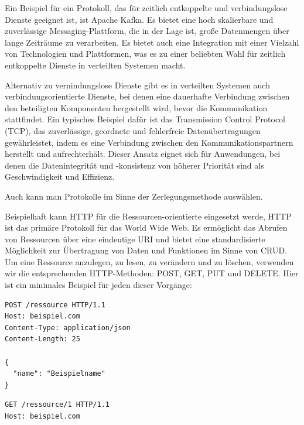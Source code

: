 Ein Beispiel für ein Protokoll, das für zeitlich entkoppelte und verbindungslose Dienste geeignet ist, ist Apache Kafka. Es bietet eine hoch skalierbare und zuverlässige Messaging-Plattform, die in der Lage ist, große Datenmengen über lange Zeiträume zu verarbeiten. Es bietet auch eine Integration mit einer Vielzahl von Technologien und Plattformen, was es zu einer beliebten Wahl für zeitlich entkoppelte Dienste in verteilten Systemen macht.

Alternativ zu vernindungslose Dienste gibt es in verteilten Systemen auch verbindungsorientierte Dienste, bei denen eine dauerhafte Verbindung zwischen den beteiligten Komponenten hergestellt wird, bevor die Kommunikation stattfindet. Ein typisches Beispiel dafür ist das Transmission Control Protocol (TCP), das zuverlässige, geordnete und fehlerfreie Datenübertragungen gewährleistet, indem es eine Verbindung zwischen den Kommunikationspartnern herstellt und aufrechterhält. Dieser Ansatz eignet sich für Anwendungen, bei denen die Datenintegrität und -konsistenz von höherer Priorität sind als Geschwindigkeit und Effizienz.

Auch kann man Protokolle im Sinne der Zerlegungsmethode auswählen. 

Beispielhaft kann HTTP für die Ressourcen-orientierte eingesetzt werde, HTTP ist das primäre Protokoll für das World Wide Web. Es ermöglicht das Abrufen von Ressourcen über eine eindeutige URI und bietet eine standardisierte Möglichkeit zur Übertragung von Daten und Funktionen im Sinne von CRUD. 
Um eine Ressource anzulegen, zu lesen, zu verändern und zu löschen, verwenden wir die entsprechenden HTTP-Methoden: POST, GET, PUT und DELETE. Hier ist ein minimales Beispiel für jeden dieser Vorgänge:

\noindent\begin{minipage}{\textwidth}
\begin{lstlisting}[caption={Ressource anlegen (POST)},captionpos=b,label={lst:post}]
POST /ressource HTTP/1.1
Host: beispiel.com
Content-Type: application/json
Content-Length: 25

{
  "name": "Beispielname"
}

\end{lstlisting}
\end{minipage}

\noindent\begin{minipage}{\textwidth}
\begin{lstlisting}[caption={Ressource lesen (GET)},captionpos=b,label={lst:get}]
GET /ressource/1 HTTP/1.1
Host: beispiel.com
\end{lstlisting}
\end{minipage}

